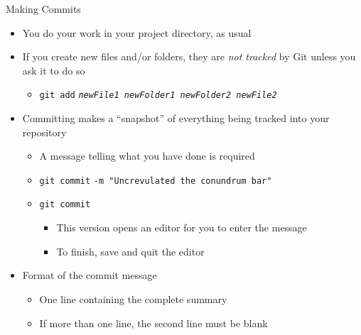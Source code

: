 \documentclass[aspectratio=169,11pt,t]{beamer}
\newcommand{\cmd}[1]{\textcolor{cmdcol}{\texttt{#1}}}    %
\newcommand{\ph}[1]{\textit{#1}}                         %
\begin{document}
\begin{frame}{Making Commits}
  \small
  \begin{itemize}
    \item You do your work in your project directory, as usual
    \item If you create new files and/or folders, they are \emph{not tracked} by Git unless you ask it to do so
      \begin{itemize}
        \item \cmd{git add} \texttt{\ph{newFile1 newFolder1 newFolder2 newFile2}}
      \end{itemize}
    \item Committing makes a ``snapshot'' of everything being tracked into your repository
      \begin{itemize}
        \item A message telling what you have done is required
        \item \cmd{git commit} \texttt{-m "Uncrevulated the conundrum bar"}
        \item \cmd{git commit}
          \begin{itemize}
            \item This version opens an editor for you to enter the message
            \item To finish, save and quit the editor
          \end{itemize}
      \end{itemize}
    \item Format of the commit message
      \begin{itemize}
        \item One line containing the complete summary
        \item If more than one line, the second line must be blank
      \end{itemize}
  \end{itemize}
\end{frame}
\end{document}
